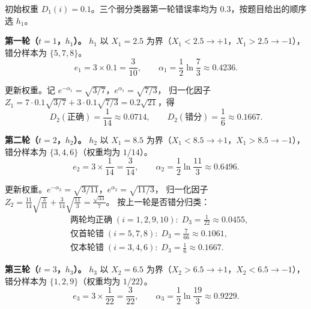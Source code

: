 \documentclass[a4, 10pt, comentarios]{aleph-notas}
\begin{document}
初始权重 $D_1(i)=0.1$。三个弱分类器第一轮错误率均为 $0.3$，按题目给出的顺序选 $h_1$。

\textbf{第一轮（$t=1$，$h_1$）。}
$h_1$ 以 $X_1=2.5$ 为界（$X_1<2.5\to+1$，$X_1>2.5\to-1$），
错分样本为 $\{5,7,8\}$。
\[
e_1 = 3\times 0.1 = \frac{3}{10},\qquad
\alpha_1 = \frac12\ln\frac{7}{3}\approx 0.4236.
\]

更新权重。记 $e^{-\alpha_1}=\sqrt{3/7}$，$e^{\alpha_1}=\sqrt{7/3}$，
归一化因子 $Z_1 = 7\cdot0.1\sqrt{3/7}+3\cdot0.1\sqrt{7/3}=0.2\sqrt{21}$，得
\[
D_2(\text{正确})=\frac{1}{14}\approx0.0714,\qquad
D_2(\text{错分})=\frac{1}{6}\approx0.1667.
\]

\textbf{第二轮（$t=2$，$h_2$）。}
$h_2$ 以 $X_1=8.5$ 为界（$X_1<8.5\to+1$，$X_1>8.5\to-1$），
错分样本为 $\{3,4,6\}$（权重均为 $1/14$）。
\[
e_2 = 3\times\frac{1}{14} = \frac{3}{14},\qquad
\alpha_2 = \frac12\ln\frac{11}{3}\approx 0.6496.
\]

更新权重。$e^{-\alpha_2}=\sqrt{3/11}$，$e^{\alpha_2}=\sqrt{11/3}$，
归一化因子 $Z_2 = \frac{11}{14}\sqrt{\frac{3}{11}}+\frac{3}{14}\sqrt{\frac{11}{3}}=\frac{\sqrt{33}}{7}$。
按上一轮是否错分归类：
\[
\begin{aligned}
&\text{两轮均正确}\;(i=1,2,9,10):\; D_3 = \frac{1}{22}\approx0.0455,\\[2pt]
&\text{仅首轮错}\;(i=5,7,8):\; D_3 = \frac{7}{66}\approx0.1061,\\[2pt]
&\text{仅本轮错}\;(i=3,4,6):\; D_3 = \frac{1}{6}\approx0.1667.
\end{aligned}
\]

\textbf{第三轮（$t=3$，$h_3$）。}
$h_3$ 以 $X_2=6.5$ 为界（$X_2>6.5\to+1$，$X_2<6.5\to-1$），
错分样本为 $\{1,2,9\}$（权重均为 $1/22$）。
\[
e_3 = 3\times\frac{1}{22} = \frac{3}{22},\qquad
\alpha_3 = \frac12\ln\frac{19}{3}\approx 0.9229.
\]
\end{document}
